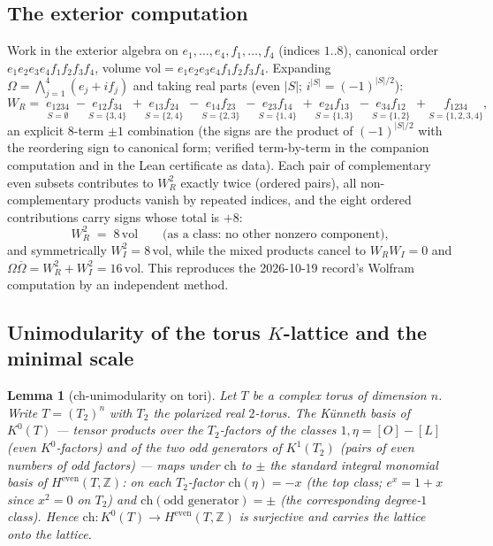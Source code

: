 \documentclass[11pt]{article}
\newtheorem{lemma}{Lemma}
\begin{document}
\subsection{The exterior computation}
Work in the exterior algebra on $e_1,\dots,e_4,f_1,\dots,f_4$ (indices $1..8$), canonical order
$e_1e_2e_3e_4f_1f_2f_3f_4$, volume $\mathrm{vol}=e_1e_2e_3e_4f_1f_2f_3f_4$. Expanding
$\Omega=\bigwedge_{j=1}^4(e_j+if_j)$ and taking real parts (even $|S|$; $i^{|S|}=(-1)^{|S|/2}$):
\[
W_R=\;\underset{S=\emptyset}{e_{1234}}
\;-\underset{S=\{3,4\}}{e_{12}f_{34}}
\;+\underset{S=\{2,4\}}{e_{13}f_{24}}
\;-\underset{S=\{2,3\}}{e_{14}f_{23}}
\;-\underset{S=\{1,4\}}{e_{23}f_{14}}
\;+\underset{S=\{1,3\}}{e_{24}f_{13}}
\;-\underset{S=\{1,2\}}{e_{34}f_{12}}
\;+\underset{S=\{1,2,3,4\}}{f_{1234}},
\]
an explicit $8$-term $\pm1$ combination (the signs are the product of $(-1)^{|S|/2}$ with the reordering sign to
canonical form; verified term-by-term in the companion computation and in the Lean certificate as data). Each
pair of complementary even subsets contributes to $W_R^2$ exactly twice (ordered pairs), all non-complementary
products vanish by repeated indices, and the eight ordered contributions carry signs whose total is $+8$:
\begin{equation}\label{eq:WR2}
W_R^2\;=\;8\,\mathrm{vol}\qquad\text{(as a class: no other nonzero component),}
\end{equation}
and symmetrically $W_I^2=8\,\mathrm{vol}$, while the mixed products cancel to $W_RW_I=0$ and
$\Omega\overline\Omega=W_R^2+W_I^2=16\,\mathrm{vol}$. This reproduces the 2026-10-19 record's Wolfram computation
by an independent method.

\subsection{Unimodularity of the torus $K$-lattice and the minimal scale}

\begin{lemma}[ch-unimodularity on tori]\label{lem:unimod}
Let $T$ be a complex torus of dimension $n$. Write $T=(T_2)^{n}$ with $T_2$ the polarized real $2$-torus. The
K\"unneth basis of $K^0(T)$ --- tensor products over the $T_2$-factors of the classes $1,\eta=[O]-[L]$ (even
$K^0$-factors) and of the two odd generators of $K^1(T_2)$ (pairs of even numbers of odd factors) --- maps under
$\mathrm{ch}$ to $\pm$ the standard integral monomial basis of $H^{\mathrm{even}}(T,\mathbb{Z})$:
on each $T_2$-factor $\mathrm{ch}(\eta)=-x$ (the top class; $e^{x}=1+x$ since $x^2=0$ on $T_2$) and
$\mathrm{ch}(\text{odd generator})=\pm$ (the corresponding degree-$1$ class). Hence
$\mathrm{ch}\colon K^0(T)\to H^{\mathrm{even}}(T,\mathbb{Z})$ is surjective and carries the lattice onto the lattice.
\end{lemma}
\end{document}
